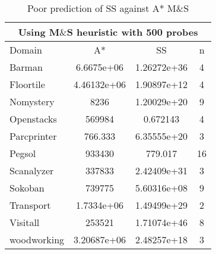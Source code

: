 \begin{table}[]
\centering
\caption{Poor prediction of SS against A* M$\&$S}
\label{tb:pred_ss_a_mand}
\begin{tabular}{lccc}
\hline
\multicolumn{4}{c}{Using M$\&$S heuristic with 500 probes} \\ \hline
Domain& A*& SS& n \\ \hline

Barman& 6.6675e+06& 1.26272e+36& 4\\
Floortile& 4.46132e+06& 1.90897e+12& 4\\
Nomystery& 8236& 1.20029e+20& 9\\
Openstacks& 569984& 0.672143& 4\\
Parcprinter& 766.333& 6.35555e+20& 3\\
Pegsol& 933430& 779.017& 16\\
Scanalyzer& 337833& 2.42409e+31& 3\\
Sokoban& 739775& 5.60316e+08& 9\\
Transport& 1.7334e+06& 1.49499e+29& 2\\
Visitall& 253521& 1.71074e+46& 8\\
woodworking& 3.20687e+06& 2.48257e+18& 3\\ \hline
\end{tabular}
\end{table}
\fi

